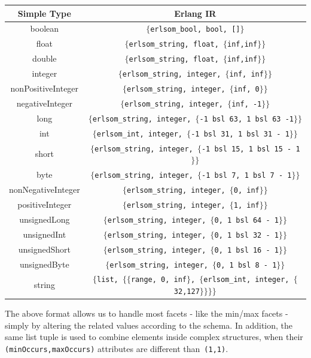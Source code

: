 \documentclass[submission,copyright]{eptcs}
\begin{document}
\begin{center}\footnotesize
  \begin{tabular}{cc}
    \toprule
    Simple Type & Erlang IR\\
    \midrule
    boolean & \texttt{$\{$erlsom\_bool, bool, []$\}$}\\
    float & \texttt{$\{$erlsom\_string, float, $\{$inf,inf$\}\}$}\\
    double & \texttt{$\{$erlsom\_string, float, $\{$inf,inf$\}\}$}\\
    integer & \texttt{$\{$erlsom\_string, integer, $\{$inf, inf$\}\}$}\\
    nonPositiveInteger & \texttt{$\{$erlsom\_string, integer, $\{$inf, 0$\}\}$}\\
    negativeInteger & \texttt{$\{$erlsom\_string, integer, $\{$inf, -1$\}\}$}\\
    long & \texttt{$\{$erlsom\_string, integer, $\{$-1 bsl 63, 1 bsl 63 -1$\}\}$}\\
    int & \texttt{$\{$erlsom\_int, integer, $\{$-1 bsl 31, 1 bsl 31 - 1$\}\}$}\\
    short & \texttt{$\{$erlsom\_string, integer, $\{$-1 bsl 15, 1 bsl 15 - 1$\}\}$}\\
    byte & \texttt{$\{$erlsom\_string, integer, $\{$-1 bsl 7, 1 bsl 7 - 1$\}\}$}\\
    nonNegativeInteger & \texttt{$\{$erlsom\_string, integer, $\{$0, inf$\}\}$}\\
    positiveInteger & \texttt{$\{$erlsom\_string, integer, $\{$1, inf$\}\}$}\\
    unsignedLong & \texttt{$\{$erlsom\_string, integer, $\{$0, 1 bsl 64 - 1$\}\}$}\\
    unsignedInt & \texttt{$\{$erlsom\_string, integer, $\{$0, 1 bsl 32 - 1$\}\}$}\\
    unsignedShort & \texttt{$\{$erlsom\_string, integer, $\{$0, 1 bsl 16 - 1$\}\}$}\\
    unsignedByte & \texttt{$\{$erlsom\_string, integer, $\{$0, 1 bsl 8 - 1$\}\}$}\\
    string & \texttt{$\{$list, $\{\{$range, 0, inf$\}$, $\{$erlsom\_int, integer, $\{$32,127$\}\}\}\}$}\\
    \bottomrule
  \end{tabular}
\end{center}

The above format allows us to handle most facets - like the min/max facets - 
simply by altering the related values according to the schema. In addition, the
same list tuple is used to combine elements inside complex structures, when
their \texttt{(minOccurs,maxOccurs)} attributes are different than~\texttt{(1,1)}.
\end{document}
